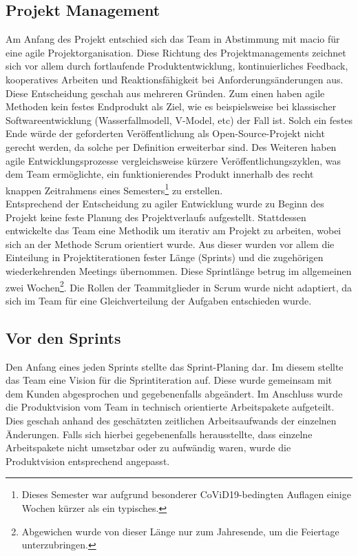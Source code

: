 \documentclass[10pt, a4paper]{article}
\begin{document}
\begin{onehalfspace}
  \subsection{Projekt Management}
  Am Anfang des Projekt entschied sich das Team in Abstimmung mit macio für eine agile Projektorganisation.
  Diese Richtung des Projektmanagements zeichnet sich vor allem durch fortlaufende Produktentwicklung, kontinuierliches Feedback, kooperatives Arbeiten und
  Reaktionsfähigkeit bei Anforderungsänderungen aus. Diese Entscheidung geschah aus mehreren Gründen.
  Zum einen haben agile Methoden kein festes Endprodukt als Ziel, wie es beispielsweise bei klassischer Softwareentwicklung
  (Wasserfallmodell, V-Model, etc) der Fall ist. Solch ein festes Ende würde der geforderten Veröffentlichung als Open-Source-Projekt nicht gerecht werden,
  da solche per Definition erweiterbar sind. Des Weiteren haben agile Entwicklungsprozesse vergleichsweise kürzere Veröffentlichungszyklen,
  was dem Team ermöglichte, ein funktionierendes Produkt innerhalb des recht knappen Zeitrahmens eines
  Semesters\footnote{Dieses Semester war aufgrund besonderer CoViD19-bedingten Auflagen einige Wochen kürzer als ein typisches.} zu erstellen.
  \\
  Entsprechend der Entscheidung zu agiler Entwicklung wurde zu Beginn des Projekt keine feste Planung des Projektverlaufs aufgestellt.
  Stattdessen entwickelte das Team eine Methodik um iterativ am Projekt zu arbeiten, wobei sich an der Methode Scrum orientiert wurde.
  Aus dieser wurden vor allem die Einteilung in Projektiterationen fester Länge (Sprints) und die zugehörigen wiederkehrenden Meetings übernommen.
  Diese Sprintlänge betrug im allgemeinen zwei Wochen\footnote{Abgewichen wurde von dieser Länge nur zum Jahresende, um die Feiertage unterzubringen.}.
  Die Rollen der Teammitglieder in Scrum wurde nicht adaptiert, da sich im Team für eine Gleichverteilung der Aufgaben entschieden wurde.

  \subsection{Vor den Sprints}
  Den Anfang eines jeden Sprints stellte das Sprint-Planing dar.
  Im diesem stellte das Team eine Vision für die Sprintiteration auf.
  Diese wurde gemeinsam mit dem Kunden abgesprochen und gegebenenfalls abgeändert.
  Im Anschluss wurde die Produktvision vom Team in technisch orientierte Arbeitspakete aufgeteilt.
  Dies geschah anhand des geschätzten zeitlichen Arbeitsaufwands der einzelnen Änderungen.
  Falls sich hierbei gegebenenfalls herausstellte, dass einzelne Arbeitspakete nicht umsetzbar oder zu aufwändig waren, wurde die Produktvision entsprechend angepasst.



\end{onehalfspace}
\end{document}
